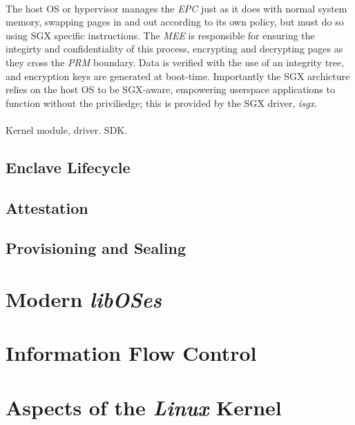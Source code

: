 \paragraph{} The host OS or hypervisor manages the \textit{EPC} just as it does with normal system memory, swapping pages in and out according to its own policy, but must do so using SGX specific instructions. The \textit{MEE} is responsible for ensuring the integirty and confidentiality of this process, encrypting and decrypting pages as they cross the \textit{PRM} boundary. Data is verified with the use of an integrity tree, and encryption keys are generated at boot-time. Importantly the SGX archicture relies on the host OS to be SGX-aware, empowering userspace applications to function without the priviliedge; this is provided by the SGX driver, \textit{isgx}.

\paragraph{} Kernel module, driver. SDK.

\subsection{Enclave Lifecycle}

\subsection{Attestation}

\subsection{Provisioning and Sealing}

\section{Modern \textit{libOSes}}

\section{Information Flow Control}

\section{Aspects of the \textit{Linux} Kernel}